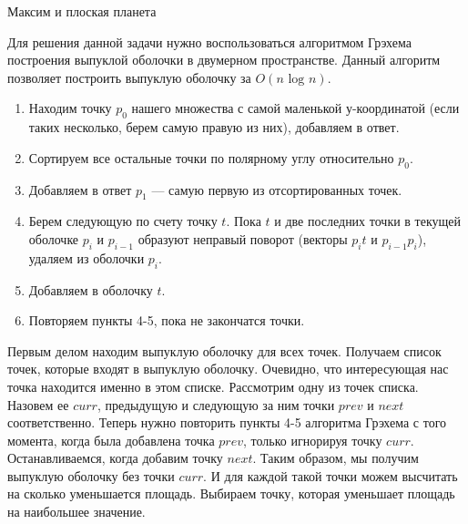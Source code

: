 \begin{tutorial}{Максим и плоская планета}

Для решения данной задачи нужно воспользоваться алгоритмом Грэхема построения выпуклой оболочки в двумерном пространстве. Данный алгоритм позволяет построить выпуклую оболочку за $O(n \mbox{ log } n)$.

\begin{enumerate}
\item Находим точку $p_0$ нашего множества с самой маленькой у-координатой (если таких несколько, берем самую правую из них), добавляем в ответ.
\item Сортируем все остальные точки по полярному углу относительно $p_0$.
\item Добавляем в ответ $p_1$ --- самую первую из отсортированных точек.
\item Берем следующую по счету точку $t$. Пока $t$ и две последних точки в текущей оболочке $p_i$ и $p_{i-1}$ образуют неправый поворот (векторы $p_i t$ и $p_{i-1} p_i$), удаляем из оболочки $p_i$.
\item Добавляем в оболочку $t$.
\item Повторяем пункты 4-5, пока не закончатся точки.
\end {enumerate}


Первым делом находим выпуклую оболочку для всех точек. Получаем список точек, которые входят в выпуклую оболочку. Очевидно, что интересующая нас точка находится именно в этом списке. Рассмотрим одну из точек списка. Назовем ее $curr$, предыдущую и следующую за ним точки $prev$ и $next$ соответственно. Теперь нужно повторить пункты 4-5 алгоритма Грэхема с того момента, когда была добавлена точка $prev$, только игнорируя точку $curr$. Останавливаемся, когда добавим точку $next$. Таким образом, мы получим выпуклую оболочку без точки $curr$. И для каждой такой точки можем высчитать на сколько уменьшается площадь. Выбираем точку, которая уменьшает площадь на наибольшее значение. 

\end{tutorial}
